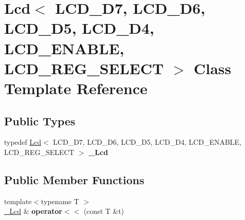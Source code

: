 \hypertarget{classLcd}{}\section{Lcd$<$ L\+C\+D\+\_\+\+D7, L\+C\+D\+\_\+\+D6, L\+C\+D\+\_\+\+D5, L\+C\+D\+\_\+\+D4, L\+C\+D\+\_\+\+E\+N\+A\+B\+LE, L\+C\+D\+\_\+\+R\+E\+G\+\_\+\+S\+E\+L\+E\+CT $>$ Class Template Reference}
\label{classLcd}
\subsection*{Public Types}
\begin{DoxyCompactItemize}
\item 
\hypertarget{classLcd_ae69976feb51799d3e9991dd74b060675}{}\label{classLcd_ae69976feb51799d3e9991dd74b060675} 
typedef \hyperlink{classLcd}{Lcd}$<$ L\+C\+D\+\_\+\+D7, L\+C\+D\+\_\+\+D6, L\+C\+D\+\_\+\+D5, L\+C\+D\+\_\+\+D4, L\+C\+D\+\_\+\+E\+N\+A\+B\+LE, L\+C\+D\+\_\+\+R\+E\+G\+\_\+\+S\+E\+L\+E\+CT $>$ {\bfseries \+\_\+\+Lcd}
\end{DoxyCompactItemize}
\subsection*{Public Member Functions}
\begin{DoxyCompactItemize}
\item 
\hypertarget{classLcd_ae12b6a315191a6be957d0da7479f8e7c}{}\label{classLcd_ae12b6a315191a6be957d0da7479f8e7c} 
{\footnotesize template$<$typename T $>$ }\\\hyperlink{classLcd}{\+\_\+\+Lcd} \& {\bfseries operator$<$$<$} (const T \&t)
\end{DoxyCompactItemize}
